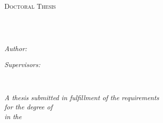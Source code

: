 \documentclass[
  letterpaper,
  11pt,
  english,
  onehalfspacing,
  headsepline]{MastersDoctoralThesis}
\author{Cillian
Berragan} %
\begin{document}
\frontmatter %

\pagestyle{plain} %


\begin{titlepage}
\begin{center}

\vspace*{.06\textheight}
{\scshape\LARGE \univname\par}\vspace{1.5cm} %
\textsc{\Large Doctoral Thesis}\\[0.5cm] %

\HRule \\[0.4cm] %
{\huge \bfseries \ttitle\par}\vspace{0.4cm} %
\HRule \\[1.5cm] %
 
\begin{minipage}[t]{0.4\textwidth}
\begin{flushleft} \large
\emph{Author:}\\
\authorname
\end{flushleft}
\end{minipage}
\begin{minipage}[t]{0.4\textwidth}
\begin{flushright} \large
\emph{Supervisors:} \\
%
\supname

\end{flushright}
\end{minipage}\\[3cm]
 
\vfill

\large \textit{A thesis submitted in fulfillment of the requirements\\ for the degree of \degreename}\\[0.3cm] %
\textit{in the}\\[0.4cm]
\groupname\\
\deptname\\[2cm] %
 
\vfill


 
\vfill
\end{center}
\end{titlepage}
\end{document}
